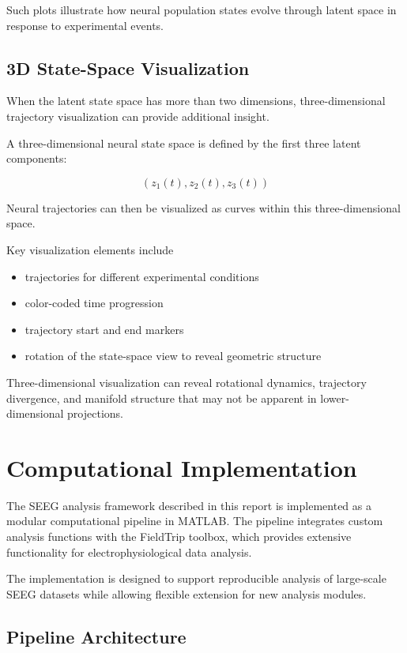 \documentclass[11pt]{report}
\begin{document}
Such plots illustrate how neural population states evolve through
latent space in response to experimental events.

\section{3D State-Space Visualization}

When the latent state space has more than two dimensions,
three-dimensional trajectory visualization can provide additional
insight.

A three-dimensional neural state space is defined by the first
three latent components:

\begin{equation}
(z_1(t), z_2(t), z_3(t))
\end{equation}

Neural trajectories can then be visualized as curves within this
three-dimensional space.

Key visualization elements include

\begin{itemize}
\item trajectories for different experimental conditions
\item color-coded time progression
\item trajectory start and end markers
\item rotation of the state-space view to reveal geometric structure
\end{itemize}

Three-dimensional visualization can reveal rotational dynamics,
trajectory divergence, and manifold structure that may not be
apparent in lower-dimensional projections.

\chapter{Computational Implementation}

The SEEG analysis framework described in this report is implemented
as a modular computational pipeline in MATLAB. The pipeline integrates
custom analysis functions with the FieldTrip toolbox, which provides
extensive functionality for electrophysiological data analysis.

The implementation is designed to support reproducible analysis of
large-scale SEEG datasets while allowing flexible extension for new
analysis modules.

\section{Pipeline Architecture}
\end{document}
